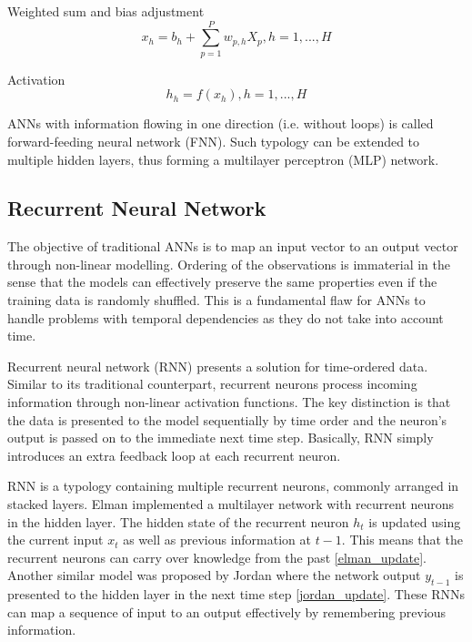 \documentclass[11pt]{article} %
\theoremstyle{plain}
\theoremstyle{definition}
\begin{document}
Weighted sum and bias adjustment
\begin{equation}
\label{weightedinput}
x_h=b_h+\sum_{p=1}^{P} w_{p,h}X_p , h=1,...,H
\end{equation}

Activation
\begin{equation}
\label{activation}
h_h=f(x_h), h=1,...,H
\end{equation}

ANNs with information flowing in one direction (i.e. without loops) is called forward-feeding neural network (FNN). Such typology can be extended to multiple hidden layers, thus forming a multilayer perceptron (MLP) network.

\subsection{Recurrent Neural Network}

The objective of traditional ANNs is to map an input vector to an output vector through non-linear modelling. Ordering of the observations is immaterial in the sense that the models can effectively preserve the same properties even if the training data is randomly shuffled. This is a fundamental flaw for ANNs to handle problems with temporal dependencies as they do not take into account time.

Recurrent neural network (RNN) presents a solution for time-ordered data. Similar to its traditional counterpart, recurrent neurons process incoming information through non-linear activation functions. The key distinction is that the data is presented to the model sequentially by time order and the neuron’s output is passed on to the immediate next time step. Basically, RNN simply introduces an extra feedback loop at each recurrent neuron. 

RNN is a typology containing multiple recurrent neurons, commonly arranged in stacked layers. Elman \cite{elman} implemented a multilayer network with recurrent neurons in the hidden layer. The hidden state of the recurrent neuron \(h_t\) is updated using the current input \(x_t\) as well as previous information at \(t-1\). This means that the recurrent neurons can carry over knowledge from the past \eqref{elman_update}. Another similar model was proposed by Jordan \cite{jordan} where the network output \(y_{t-1}\) is presented to the hidden layer in the next time step \eqref{jordan_update}. These RNNs can map a sequence of input to an output effectively by remembering previous information.
\end{document}
